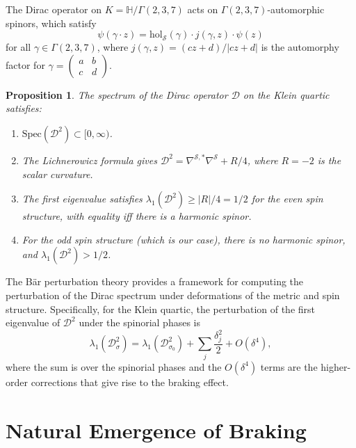 \documentclass[12pt,a4paper]{article}
\newtheorem{proposition}[theorem]{Proposition}
\theoremstyle{definition}
\theoremstyle{remark}
\newcommand{\HH}{\mathbb{H}}
\newcommand{\hol}{\mathrm{hol}}
\newcommand{\Spec}{\mathrm{Spec}}
\newcommand{\cD}{\mathcal{D}}
\newcommand{\cS}{\mathcal{S}}
\begin{document}
The Dirac operator on $K = \HH/\Gamma(2,3,7)$ acts on $\Gamma(2,3,7)$-automorphic spinors, which satisfy
\begin{equation}
\psi(\gamma \cdot z) = \hol_{\cS}(\gamma) \cdot j(\gamma, z) \cdot \psi(z)
\end{equation}
for all $\gamma \in \Gamma(2,3,7)$, where $j(\gamma, z) = (cz + d)/|cz + d|$ is the automorphy factor for $\gamma = \begin{pmatrix} a & b \\ c & d \end{pmatrix}$.

\begin{proposition}
The spectrum of the Dirac operator $\cD$ on the Klein quartic satisfies:
\begin{enumerate}[label=(\roman*)]
\item $\Spec(\cD^2) \subset [0, \infty)$.
\item The Lichnerowicz formula gives $\cD^2 = \nabla^{\cS,*}\nabla^{\cS} + R/4$, where $R = -2$ is the scalar curvature.
\item The first eigenvalue satisfies $\lambda_1(\cD^2) \geq |R|/4 = 1/2$ for the even spin structure, with equality iff there is a harmonic spinor.
\item For the odd spin structure (which is our case), there is no harmonic spinor, and $\lambda_1(\cD^2) > 1/2$.
\end{enumerate}
\end{proposition}

The B\"ar perturbation theory \cite{Baer1992} provides a framework for computing the perturbation of the Dirac spectrum under deformations of the metric and spin structure. Specifically, for the Klein quartic, the perturbation of the first eigenvalue of $\cD^2$ under the spinorial phases is
\begin{equation}
\lambda_1(\cD^2_{\sigma}) = \lambda_1(\cD^2_{\sigma_0}) + \sum_j \frac{\delta_j^2}{2} + O(\delta^4),
\end{equation}
where the sum is over the spinorial phases and the $O(\delta^4)$ terms are the higher-order corrections that give rise to the braking effect.

\section{Natural Emergence of Braking}
\label{sec:braking}
\end{document}
